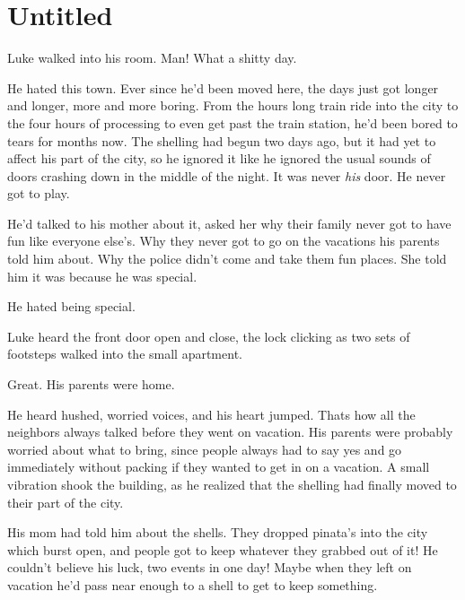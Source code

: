 \chapter{Untitled}


Luke walked into his room. Man! What a shitty day.



He hated this town. Ever since he'd been moved here, the days just
got longer and longer, more and more boring. From the hours long
train ride into the city to the four hours of processing to even
get past the train station, he'd been bored to tears for months
now. The shelling had begun two days ago, but it had yet to affect
his part of the city, so he ignored it like he ignored the usual
sounds of doors crashing down in the middle of the night. It was
never {\em his} door. He never got to play.



He'd talked to his mother about it, asked her why their family
never got to have fun like everyone else's. Why they never got to
go on the vacations his parents told him about. Why the police
didn't come and take them fun places. She told him it was because
he was special.



He hated being special.



Luke heard the front door open and close, the lock clicking as two
sets of footsteps walked into the small apartment.



Great. His parents were home.



He heard hushed, worried voices, and his heart jumped. Thats how
all the neighbors always talked before they went on vacation. His
parents were probably worried about what to bring, since people
always had to say yes and go immediately without packing if they
wanted to get in on a vacation. A small vibration shook the
building, as he realized that the shelling had finally moved to
their part of the city.



His mom had told him about the shells. They dropped pinata's into
the city which burst open, and people got to keep whatever they
grabbed out of it! He couldn't believe his luck, two events in one
day! Maybe when they left on vacation he'd pass near enough to a
shell to get to keep something.



